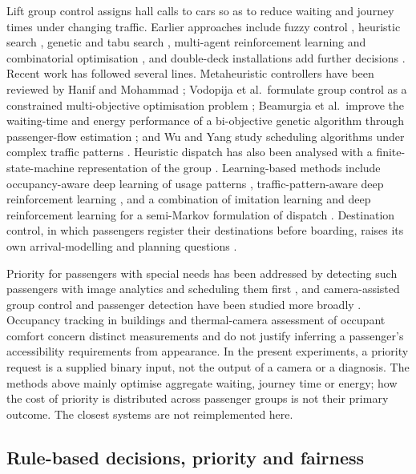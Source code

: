 Lift group control assigns hall calls to cars so as to reduce waiting and journey times under changing traffic. Earlier approaches include fuzzy control \cite{ref11,ref16,ref25}, heuristic search \cite{ref12}, genetic and tabu search \cite{ref13,ref15}, multi-agent reinforcement learning \cite{ref26} and combinatorial optimisation \cite{ref28}, and double-deck installations add further decisions \cite{ref24}. Recent work has followed several lines. Metaheuristic controllers have been reviewed by Hanif and Mohammad \cite{hanif2023}; Vodopija et al.~formulate group control as a constrained multi-objective optimisation problem \cite{vodopija2022}; Beamurgia et al.~improve the waiting-time and energy performance of a bi-objective genetic algorithm through passenger-flow estimation \cite{beamurgia2022}; and Wu and Yang study scheduling algorithms under complex traffic patterns \cite{wu2024}. Heuristic dispatch has also been analysed with a finite-state-machine representation of the group \cite{gharbi2024}. Learning-based methods include occupancy-aware deep learning of usage patterns \cite{ref1}, traffic-pattern-aware deep reinforcement learning \cite{ref3}, and a combination of imitation learning and deep reinforcement learning for a semi-Markov formulation of dispatch \cite{wan2026}. Destination control, in which passengers register their destinations before boarding, raises its own arrival-modelling and planning questions \cite{ref27,siikonen2026}.

Priority for passengers with special needs has been addressed by detecting such passengers with image analytics and scheduling them first \cite{ref5}, and camera-assisted group control and passenger detection have been studied more broadly \cite{ref17,ref20,ref21}. Occupancy tracking in buildings \cite{ref19} and thermal-camera assessment of occupant comfort \cite{ref18} concern distinct measurements and do not justify inferring a passenger's accessibility requirements from appearance. In the present experiments, a priority request is a supplied binary input, not the output of a camera or a diagnosis. The methods above mainly optimise aggregate waiting, journey time or energy; how the cost of priority is distributed across passenger groups is not their primary outcome. The closest systems \cite{ref1,ref3,ref5} are not reimplemented here.

\subsection{Rule-based decisions, priority and fairness}\label{representation-and-evaluation}

